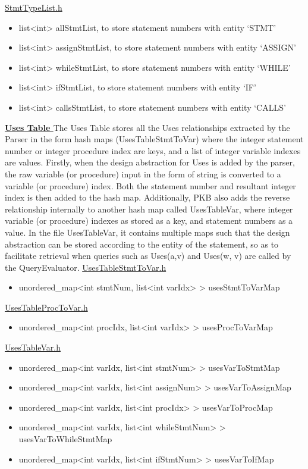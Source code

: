 \documentclass[12pt]{article}
\begin{document}
\underline{StmtTypeList.h}
\begin{itemize}
\item list<int> allStmtList, to store statement numbers with entity ‘STMT’
\item list<int> assignStmtList, to store statement numbers with entity ‘ASSIGN’
\item list<int> whileStmtList, to store statement numbers with entity ‘WHILE’
\item list<int> ifStmtList, to store statement numbers with entity ‘IF’
\item list<int> callsStmtList, to store statement numbers with entity ‘CALLS’
\end{itemize}
\textbf{\underline{Uses Table
}}
\newline The Uses Table stores all the Uses relationships extracted by the Parser in the form hash maps (UsesTableStmtToVar) where the integer statement number or integer procedure index are keys, and a list of integer variable indexes are values. Firstly, when the design abstraction for Uses is added by the parser, the raw variable (or procedure) input in the form of string is converted to a variable (or procedure) index. Both the statement number and resultant integer index is then added to the hash map. Additionally, PKB also adds the reverse relationship internally to another hash map called UsesTableVar, where integer variable (or procedure) indexes as stored as a key, and statement numbers as a value. In the file UsesTableVar, it contains multiple maps such that the design abstraction can be stored according to the entity of the statement, so as to facilitate retrieval when queries such as Uses(a,v) and Uses(w, v) are called by the QueryEvaluator. \newline
\underline{UsesTableStmtToVar.h}
\begin{itemize}
\item unordered\_map<int stmtNum, list<int varIdx> > usesStmtToVarMap
\end{itemize}
\underline{UsesTableProcToVar.h}
\begin{itemize}
\item unordered\_map<int procIdx, list<int varIdx> > usesProcToVarMap
\end{itemize}
\underline{UsesTableVar.h}
\begin{itemize}
\item unordered\_map<int varIdx, list<int stmtNum> > usesVarToStmtMap
\item unordered\_map<int varIdx, list<int assignNum> > usesVarToAssignMap
\item unordered\_map<int varIdx, list<int procIdx> > usesVarToProcMap
\item unordered\_map<int varIdx, list<int whileStmtNum> > usesVarToWhileStmtMap
\item unordered\_map<int varIdx, list<int ifStmtNum> > usesVarToIfMap
\end{itemize}
\end{document}
